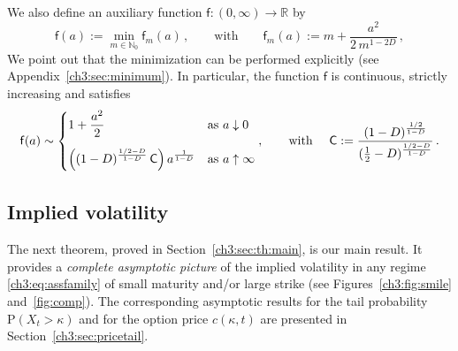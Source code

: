 \documentclass[a4paper,reqno,11pt]{amsart}
\numberwithin{equation}{section}
\newtheorem{remark}[theorem]{Remark}
\newcommand{\R}{\mathbb{R}}
\newcommand{\N}{\mathbb{N}}
\newcommand{\PEfont}{\mathrm}
\renewcommand{\P}{\ensuremath{\PEfont P}}
\newcommand\sfc{\mathsf{c}}
\newcommand\sff{\mathsf{f}}
\newcommand\sfC{\mathsf{C}}
\newcommand\blue{\color{blue}}
\begin{document}
We also define an auxiliary function $\sff: (0,\infty) \to \R$ by
\begin{equation}\label{ch3:eq:f}
	\sff(a) := \min_{m \in \N_0} \sff_m(a) \,, \qquad
	\text{with} \qquad
	\sff_m(a) := m + \frac{a^2}{2\, m^{1-2D}}  \,,
\end{equation}
We point out that the minimization
can be performed explicitly (see Appendix~\ref{ch3:sec:minimum}).
In particular, the function $\sff$ 
is continuous, strictly increasing and satisfies
\begin{equation}\label{ch3:eq:asf}
	\sff(a) \sim \begin{cases}
	\displaystyle 1 + \frac{ a^2}{2}
	& \text{as } a \downarrow 0 \\
	\rule[-0.8em]{0pt}{2.9em}\displaystyle
	\Big((1-D)^{\frac{1/2-D}{1-D}}
	\, \sfC\Big) \, 
	a^{\frac{1}{1-D}}
	& \text{as } a \uparrow \infty
	\end{cases} , \qquad \text{with} \quad \ 
	\sfC := 
	\frac{(1-D)^{\frac{1/2}{1-D}}}
	{(\frac{1}{2}-D)^{\frac{1/2-D}{1-D}}} \,.
\end{equation}


\subsection{Implied volatility}

The next theorem, proved in Section~\ref{ch3:sec:th:main}, is our main result.
It provides a \emph{complete asymptotic picture} of the implied volatility
in any regime \eqref{ch3:eq:assfamily} of small maturity and/or large strike
(see Figures~\ref{ch3:fig:smile} and~\ref{fig:comp}).
The corresponding asymptotic results for the tail probability
$\P(X_t > \kappa)$ and for the option price $c(\kappa,t)$
are presented in Section~\ref{ch3:sec:pricetail}.
\end{document}
